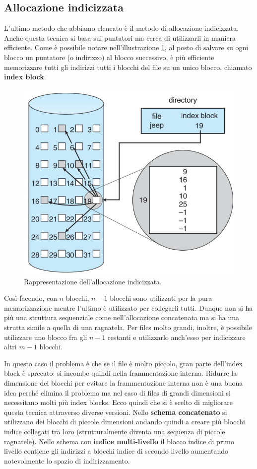\subsection{Allocazione indicizzata}
L'ultimo metodo che abbiamo elencato è il metodo di allocazione indicizzata. Anche questa tecnica si basa sui puntatori ma cerca di utilizzarli in maniera efficiente. Come è possibile notare nell'illustrazione \ref{fig:allocazione indicizzata}, al posto di salvare su ogni blocco un puntatore (o indirizzo) al blocco successivo, è più efficiente memorizzare tutti gli indirizzi tutti i blocchi del file su un unico blocco, chiamato \textbf{index block}.
\begin{figure}[h]
    \centering
    \includegraphics[width = .6\textwidth]{../res/imgs/file system implementation/allocazione indicizzata.png}
    \caption{Rappresentazione dell'allocazione indicizzata.}
    \label{fig:allocazione indicizzata}
\end{figure}
Così facendo, con $n$ blocchi, $n - 1$ blocchi sono utilizzati per la pura memorizzazione mentre l'ultimo è utilizzato per collegarli tutti. Dunque non si ha più una struttura sequenziale come nell'allocazione concatenata ma si ha una strutta simile a quella di una ragnatela. Per files molto grandi, inoltre, è possibile utilizzare uno blocco fra gli $n - 1$ restanti e utilizzarlo anch'esso per indicizzare altri $m - 1$ blocchi.

In questo caso il problema è che se il file è molto piccolo, gran parte dell'index block è sprecato: si incombe quindi nella frammentazione interna. Ridurre la dimensione dei blocchi per evitare la frammentazione interna non è una buona idea perché elimina il problema ma nel caso di files di grandi dimensioni si necessitano molti più index blocks. Ecco quindi che si è scelto di migliorare questa tecnica attraverso diverse versioni. Nello \textbf{schema concatenato} si utilizzano dei blocchi di piccole dimensioni andando quindi a creare più blocchi indice collegati tra loro (strutturalmente diventa una sequenza di piccole ragnatele). Nello schema con \textbf{indice multi-livello} il blocco indice di primo livello contiene gli indirizzi a blocchi indice di secondo livello aumentando notevolmente lo spazio di indirizzamento.

